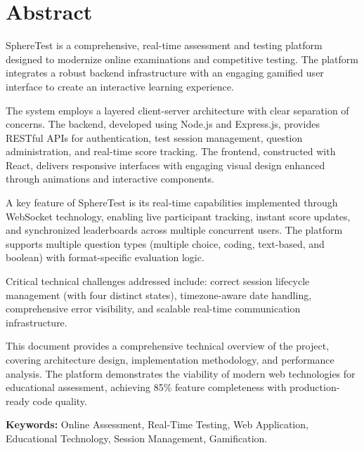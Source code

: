 \documentclass[12pt,a4paper]{report}
\begin{document}
\chapter*{Abstract}

SphereTest is a comprehensive, real-time assessment and testing platform designed to modernize online examinations and competitive testing. The platform integrates a robust backend infrastructure with an engaging gamified user interface to create an interactive learning experience.

The system employs a layered client-server architecture with clear separation of concerns. The backend, developed using Node.js and Express.js, provides RESTful APIs for authentication, test session management, question administration, and real-time score tracking. The frontend, constructed with React, delivers responsive interfaces with engaging visual design enhanced through animations and interactive components.

A key feature of SphereTest is its real-time capabilities implemented through WebSocket technology, enabling live participant tracking, instant score updates, and synchronized leaderboards across multiple concurrent users. The platform supports multiple question types (multiple choice, coding, text-based, and boolean) with format-specific evaluation logic.

Critical technical challenges addressed include: correct session lifecycle management (with four distinct states), timezone-aware date handling, comprehensive error visibility, and scalable real-time communication infrastructure.

This document provides a comprehensive technical overview of the project, covering architecture design, implementation methodology, and performance analysis. The platform demonstrates the viability of modern web technologies for educational assessment, achieving 85\% feature completeness with production-ready code quality.

\textbf{Keywords:} Online Assessment, Real-Time Testing, Web Application, Educational Technology, Session Management, Gamification.

\cleardoublepage


\tableofcontents

\cleardoublepage
\end{document}
